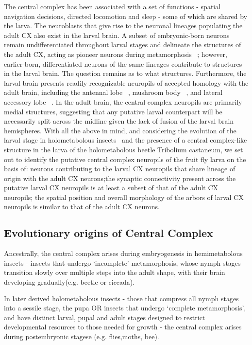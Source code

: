 The central complex has been associated with a set of functions - spatial navigation decisions, directed locomotion and sleep - some of which are shared by the larva. The neuroblasts that give rise to the neuronal lineages populating the adult CX also exist in the larval brain. A subset of embryonic-born neurons remain undifferentiated throughout larval stages and delineate the structures of the adult CX, acting as pioneer neurons during metamorphosis 
~\citep{andrade2019developmentally}; however, earlier-born, differentiated neurons of the same lineages contribute to structures in the larval brain. The question remains as to what structures. Furthermore, the larval brain presents readily recognizable neuropils of accepted homology with the adult brain, including the antennal lobe ~\citep{berck2016wiring}, mushroom body ~\citep{eichler2017complete}, and lateral accessory lobe ~\citep{hartenstein2015lineage}.
 In the adult brain, the central complex neuropils are primarily medial structures, suggesting that any putative larval counterpart will be necessarily split across the midline given the lack of fusion of the larval brain hemispheres. With all the above in mind, and considering the evolution of the larval stage in holometabolous insects ~\citep{truman1999origins}and the presence of a central complex-like structure in the larva of the holometabolous beetle Tribolium castaneum, we set out to identify the putative central complex neuropils of the fruit fly larva on the basis of: neurons contributing to the larval CX neuropils that share lineage of origin with the adult CX neurons;the synaptic connectivity present across the putative larval CX neuropils is at least a subset of that of the adult CX neuropils; the spatial position and overall morphology of the arbors of larval CX neuropils is similar to that of the adult CX neurons. 

\subsection*{Evolutionary origins of Central Complex}
Ancestrally, the central complex arises during embryogenesis in hemimetabolous insects - insects that undergo ‘incomplete’ metamorphosis, whose nymph stages transition slowly over multiple steps into the adult shape, with their brain developing gradually(e.g. beetle or ciccada).

In later derived holometabolous insects -  those that compress all nymph stages into a sessile stage, the pupa OR insects that undergo ‘complete metamorphosis’, and have distinct larval, pupal and adult stages designed to restrict developmental resources to those needed for growth - the central complex arises during  postembryonic stagese (e.g. flies,moths, bee).


